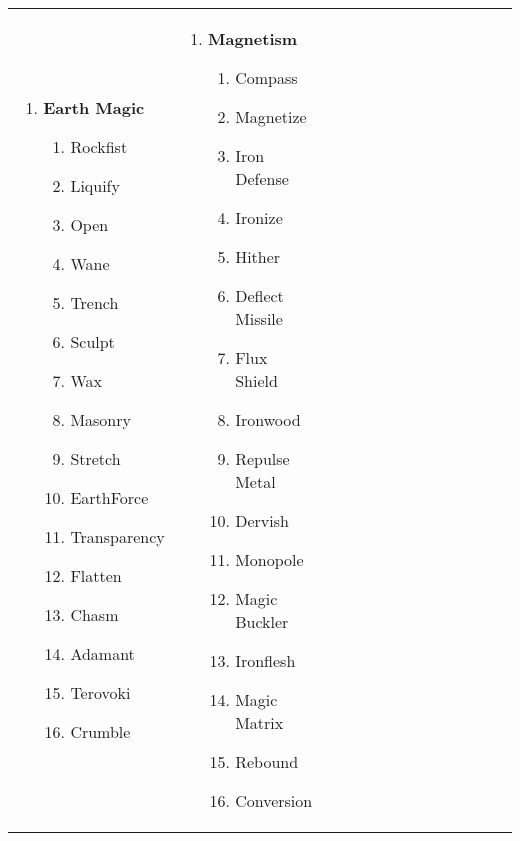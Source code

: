 \renewcommand{\labelenumii}{\arabic{enumii}.}
\begin{tabular}{@{} p{0.25\linewidth} p{0.25\linewidth} p{0.25\linewidth} p{0.25\linewidth}}
\begin{enumerate}
	\item \textbf{Earth Magic}
	\begin{enumerate}
		\item Rockfist
		\item Liquify
		\item Open
		\item Wane
		\item Trench
		\item Sculpt
		\item Wax
		\item Masonry
		\item Stretch
		\item EarthForce
		\item Transparency
		\item Flatten
		\item Chasm
		\item Adamant
		\item Terovoki
		\item Crumble
	\end{enumerate}
\end{enumerate} &
\begin{enumerate}
	\item \textbf{Magnetism}
	\begin{enumerate}
		\item Compass
		\item Magnetize
		\item Iron Defense
		\item Ironize
		\item Hither
		\item Deflect Missile
		\item Flux Shield
		\item Ironwood
		\item Repulse Metal
		\item Dervish
		\item Monopole
		\item Magic Buckler
		\item Ironflesh
		\item Magic Matrix
		\item Rebound
		\item Conversion
	\end{enumerate}
\end{enumerate} &

\end{tabular}
